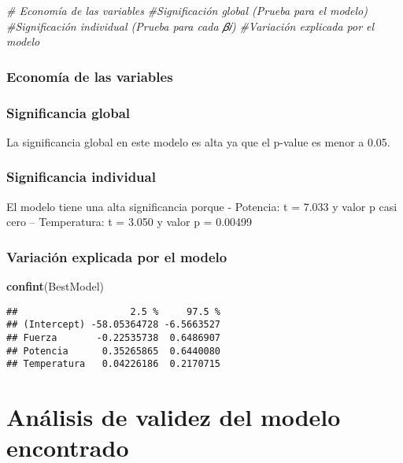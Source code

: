 \documentclass[
]{article}
\newenvironment{Shaded}{\begin{snugshade}}{\end{snugshade}}
\newcommand{\CommentTok}[1]{\textcolor[rgb]{0.56,0.35,0.01}{\textit{#1}}}
\newcommand{\FunctionTok}[1]{\textcolor[rgb]{0.13,0.29,0.53}{\textbf{#1}}}
\newcommand{\NormalTok}[1]{#1}
\begin{document}
\begin{Shaded}
\begin{Highlighting}[]
\CommentTok{\# Economía de las variables}
\CommentTok{\#Significación global (Prueba para el modelo)}
\CommentTok{\#Significación individual (Prueba para cada 𝛽𝑖)}
\CommentTok{\#Variación explicada por el modelo}
\end{Highlighting}
\end{Shaded}

\subsubsection{Economía de las
variables}\label{economuxeda-de-las-variables}

\subsubsection{Significancia global}\label{significancia-global}

La significancia global en este modelo es alta ya que el p-value es
menor a 0.05.

\subsubsection{Significancia individual}\label{significancia-individual}

El modelo tiene una alta significancia porque - Potencia: t = 7.033 y
valor p casi cero -- Temperatura: t = 3.050 y valor p = 0.00499

\subsubsection{Variación explicada por el
modelo}\label{variaciuxf3n-explicada-por-el-modelo}

\begin{Shaded}
\begin{Highlighting}[]
\FunctionTok{confint}\NormalTok{(BestModel)}
\end{Highlighting}
\end{Shaded}

\begin{verbatim}
##                    2.5 %     97.5 %
## (Intercept) -58.05364728 -6.5663527
## Fuerza       -0.22535738  0.6486907
## Potencia      0.35265865  0.6440080
## Temperatura   0.04226186  0.2170715
\end{verbatim}

\section{Análisis de validez del modelo
encontrado}\label{anuxe1lisis-de-validez-del-modelo-encontrado}
\end{document}

